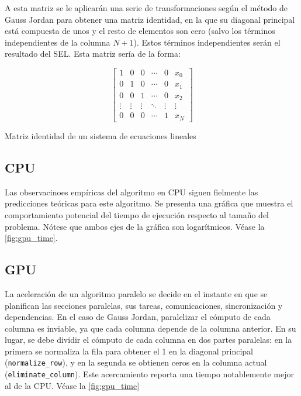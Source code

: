 A esta matriz se le aplicarán una serie de transformaciones según el método
de Gauss Jordan para obtener una matriz identidad,
en la que su diagonal principal está compuesta de unos y el resto de elementos
son cero (salvo los términos independientes de la columna $N+1$).
Estos términos independientes serán el resultado del SEL.
Esta matriz sería de la forma:

\begin{mycapequ}[h]
\begin{equation}
    \begin{bmatrix}
        1 & 0 & 0 & \cdots & 0 & x_0 \\
        0 & 1 & 0 & \cdots & 0 & x_1 \\
        0 & 0 & 1 & \cdots & 0 & x_2 \\
        \vdots & \vdots & \vdots & \ddots & \vdots & \vdots \\
        0 & 0 & 0 & \cdots & 1 & x_N
    \end{bmatrix}
\end{equation}
\caption{Matriz identidad de un sistema de ecuaciones lineales}
\label{eq:sel_identity}
\end{mycapequ}

\subsection{CPU}

Las observacinoes empíricas del algoritmo en CPU siguen fielmente
las predicciones teóricas para este algoritmo.
Se presenta una gráfica que muestra el comportamiento potencial
del tiempo de ejecución respecto al tamaño del problema.
Nótese que ambos ejes de la gráfica son logarítmicos.
Véase la \autoref{fig:gpu_time}.

\subsection{GPU}

La aceleración de un algoritmo paralelo se decide
en el instante en que se planifican las secciones paralelas,
sus tareas, comunicaciones, sincronización y dependencias.
En el caso de Gauss Jordan, paralelizar el cómputo
de cada columna es inviable, ya que cada columna
depende de la columna anterior.
En su lugar, se debe dividir el cómputo de cada columna
en dos partes paralelas: en la primera se normaliza la fila
para obtener el 1 en la diagonal principal
(\texttt{normalize\_row}),
y en la segunda se obtienen ceros en la columna actual
(\texttt{eliminate\_column}).
Este acercamiento reporta una tiempo notablemente mejor
al de la CPU. Véase la \autoref{fig:gpu_time}

